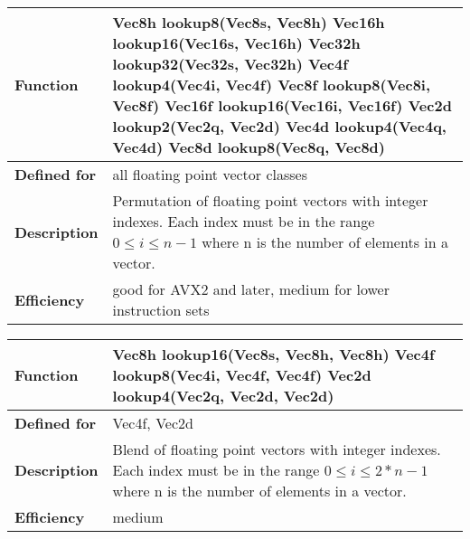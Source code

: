 \documentclass[vcl_manual.tex]{subfiles}
\begin{document}
\begin{tabular}{|p{30mm}|p{120mm}|}
\hline
\bfseries Function & 
Vec8h lookup8(Vec8s, Vec8h) \newline
Vec16h lookup16(Vec16s, Vec16h) \newline
Vec32h lookup32(Vec32s, Vec32h) \newline
Vec4f lookup4(Vec4i, Vec4f) \newline
Vec8f lookup8(Vec8i, Vec8f) \newline
Vec16f lookup16(Vec16i, Vec16f) \newline
Vec2d lookup2(Vec2q, Vec2d) \newline
Vec4d lookup4(Vec4q, Vec4d) \newline
Vec8d lookup8(Vec8q, Vec8d) \\ \hline
\bfseries Defined for & all floating point vector classes \\ \hline
\bfseries Description & Permutation of floating point vectors with integer indexes. Each index must be in the range  $0 \leq i \leq n-1$ where n is the number of elements in a vector. \\ \hline
\bfseries Efficiency & good for AVX2 and later, medium for lower instruction sets \\ \hline
\end{tabular}


\begin{tabular}{|p{30mm}|p{120mm}|}
\hline
\bfseries Function & 
Vec8h lookup16(Vec8s, Vec8h, Vec8h) \newline
Vec4f lookup8(Vec4i, Vec4f, Vec4f) \newline
Vec2d lookup4(Vec2q, Vec2d, Vec2d) \\ \hline
\bfseries Defined for & Vec4f, Vec2d \\ \hline
\bfseries Description & Blend of floating point vectors with integer indexes. Each index must be in the range  $0 \leq i \leq 2*n-1$ where n is the number of elements in a vector. \\ \hline
\bfseries Efficiency & medium \\ \hline
\end{tabular}
\end{document}
